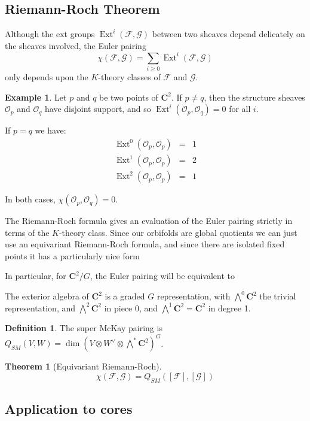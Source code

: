 \documentclass{amsart}[12pt]
\theoremstyle{definition}
\newtheorem{theorem}[dummy]{Theorem}
\newtheorem{example}[dummy]{Example}
\newtheorem{definition}[dummy]{Definition}
\newcommand{\C}{\mathbf{C}}
\DeclareMathOperator{\Ext}{Ext}
\begin{document}
\subsection{Riemann-Roch Theorem}
Although the ext groups $\Ext^i(\mathcal{F},\mathcal{G})$ between two sheaves depend delicately on the sheaves involved, the Euler pairing
$$\chi(\mathcal{F},\mathcal{G})=\sum_{i\geq 0} \Ext^i(\mathcal{F},\mathcal{G})$$
only depends upon the $K$-theory classes of $\mathcal{F}$ and $\mathcal{G}$.  

\begin{example}
Let $p$ and $q$ be two points of $\C^2$.  If $p\neq q$, then the structure sheaves $\mathcal{O}_p$ and $\mathcal{O}_q$ have disjoint support, and so $\Ext^i(\mathcal{O}_p,\mathcal{O}_q)=0$ for all $i$.

If $p=q$ we have:
\begin{eqnarray*}
\Ext^0(\mathcal{O}_p,\mathcal{O}_p)&=&1\\
\Ext^1(\mathcal{O}_p,\mathcal{O}_p)&=&2\\
\Ext^2(\mathcal{O}_p,\mathcal{O}_p)&=&1 
\end{eqnarray*}

In both cases, $\chi(\mathcal{O}_p,\mathcal{O}_q)=0$.
\end{example}

The Riemann-Roch formula gives an evaluation of the Euler pairing strictly in terms of the $K$-theory class.  Since our orbifolds are global quotients we can just use an equivariant Riemann-Roch formula, and since there are isolated fixed points it has a particularly nice form

In particular, for $\C^2/G$, the Euler pairing will be equivalent to 

The exterior algebra of $\C^2$ is a graded $G$ representation, with $\bigwedge^0\C^2$ the trivial representation, and $\bigwedge^2\C^2$ in piece 0, and $\bigwedge^1\C^2=\C^2$ in degree 1.  

\begin{definition}
The super McKay pairing is $Q_{SM}(V,W)=\dim (V\otimes W^\vee\otimes\bigwedge^*\C^2)^G$.
\end{definition}


\begin{theorem}[Equivariant Riemann-Roch]
$$\chi(\mathcal{F},\mathcal{G})=Q_{SM}([\mathcal{F}],[\mathcal{G}])$$
\end{theorem}


\subsection{Application to cores}
\end{document}
